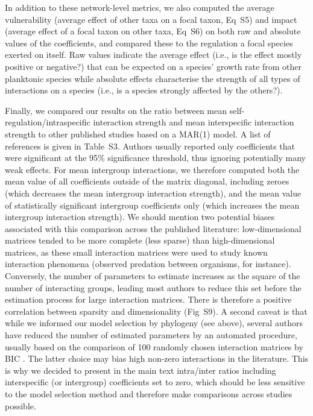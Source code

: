 \documentclass[10pt]{article}
\begin{document}
In addition to these network-level metrics, we also computed the average
vulnerability (average effect of other taxa on a focal taxon, Eq~S5) and impact (average effect of a focal taxon on other taxa,
Eq~S6) on both raw and absolute values of the coefficients,
and compared these to the regulation a focal species exerted on itself.
Raw values indicate the average effect (i.e., is the effect mostly
positive or negative?) that can be expected on a species' growth rate
from other planktonic species while absolute effects characterise
the strength of all types of interactions on a species (i.e., is a
species strongly affected by the others?).

Finally, we compared our results on the ratio between mean self-regulation/intraspecific
interaction strength and mean interspecific interaction strength to
other published studies based on a MAR(1) model. A list of references
is given in Table~S3. Authors usually reported only
coefficients that were significant at the 95\% significance threshold,
thus ignoring potentially many weak effects. For mean intergroup interactions,
we therefore computed both the mean value of all coefficients outside
of the matrix diagonal, including zeroes (which decreases the mean intergroup interaction strength), and the
mean value of statistically significant intergroup coefficients only
(which increases the mean intergroup interaction
strength). We should mention two potential biases associated with
this comparison across the published literature: low-dimensional matrices
tended to be more complete (less sparse) than high-dimensional matrices,
as these small interaction matrices were used to study known interaction
phenomena (observed predation between organisms, for instance). Conversely,
the number of parameters to estimate increases as the square of the
number of interacting groups, leading most authors to reduce this
set before the estimation process for large interaction matrices.
There is therefore a positive correlation between sparsity and dimensionality
(Fig~S9). A second caveat is that while we informed
our model selection by phylogeny (see above), several authors have
reduced the number of estimated parameters by an automated procedure,
usually based on the comparison of 100 randomly chosen interaction
matrices by BIC \citep{ives_estimating_2003}. The latter choice
may bias high non-zero interactions in the literature. This is why
we decided to present in the main text intra/inter ratios including
interspecific (or intergroup) coefficients set to zero, which should
be less sensitive to the model selection method and therefore make
comparisons across studies possible.
\end{document}

